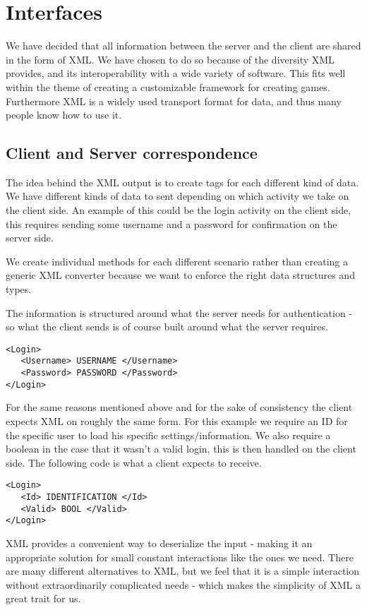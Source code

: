 \section{Interfaces}
\label{sec:interfaces}



We have decided that all information between the server and the client are shared in the form of XML. We have chosen to do so because of the diversity XML provides, and its interoperability with a wide variety of software. This fits well within the theme of creating a customizable framework for creating games. Furthermore XML is a widely used transport format for data, and thus many people know how to use it. %

\subsection{Client and Server correspondence}

The idea behind the XML output is to create tags for each different kind of data. We have different kinds of data to sent depending on which activity we take on the client side. An example of this could be the login activity on the client side, this requires sending some username and a password for confirmation on the server side.

We create individual methods for each different scenario rather than creating a generic XML converter because we want to enforce the right data structures and types. 

The information is structured around what the server needs for authentication - so what the client sends is of course built around what the server requires.

\begin{lstlisting}
<Login>
   <Username> USERNAME </Username>
   <Password> PASSWORD </Password>
</Login>
\end{lstlisting}

For the same reasons mentioned above and for the sake of consistency the client expects XML on roughly the same form. For this example we require an ID for the specific user to load his specific settings/information. We also require a boolean in the case that it wasn't a valid login, this is then handled on the client side. The following code is what a client expects to receive.

\begin{lstlisting}
<Login>
   <Id> IDENTIFICATION </Id>
   <Valid> BOOL </Valid>
</Login>
\end{lstlisting}

XML provides a convenient way to deserialize the input - making it an appropriate solution for small constant interactions like the ones we need. There are many different alternatives to XML, but we feel that it is a simple interaction without extraordinarily complicated needs - which makes the simplicity of XML a great trait for us.

%
%